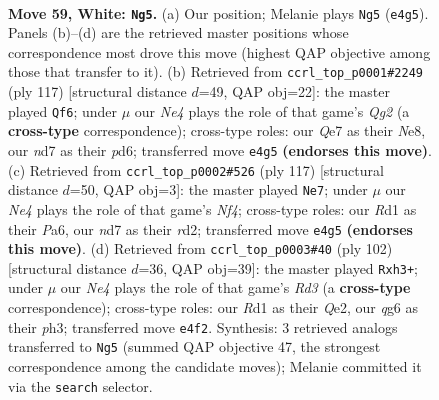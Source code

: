 \documentclass[11pt]{article}
\begin{document}
\clearpage

\begin{figure}[p]\centering
\begin{subfigure}{0.46\textwidth}\centering
\resizebox{\linewidth}{!}{%
\newchessgame
\chessboard[
  setfen={6rk/3nQ3/6q1/7p/p2pN3/P7/8/3R3K w - - 6 59},
  showmover=false,
  pgfstyle=straightmove, color=movearrow, markmove={e4-g5}
]}
\caption{}
\end{subfigure}\hfill
\begin{subfigure}{0.46\textwidth}\centering
\resizebox{\linewidth}{!}{%
\newchessgame
\chessboard[
  setfen={4n2k/6q1/p2Pp2p/8/b7/8/1P6/K5RQ b - - 7 59},
  showmover=false,
  pgfstyle=straightmove, color=movearrow, markmove={g7-f6}
]}
\caption{}
\end{subfigure}
\\[4pt]
\begin{subfigure}{0.46\textwidth}\centering
\resizebox{\linewidth}{!}{%
\newchessgame
\chessboard[
  setfen={3Q4/8/p4k2/5n2/5p1q/P7/1P1R4/5K2 b - - 4 59},
  showmover=false,
  pgfstyle=straightmove, color=movearrow, markmove={f5-e7}
]}
\caption{}
\end{subfigure}\hfill
\begin{subfigure}{0.46\textwidth}\centering
\resizebox{\linewidth}{!}{%
\newchessgame
\chessboard[
  setfen={2r4k/1p6/4q3/P2Np1b1/6P1/3R3p/4Q3/7K w - - 0 52},
  showmover=false,
  pgfstyle=straightmove, color=movearrow, markmove={d3-h3}
]}
\caption{}
\end{subfigure}
\caption{\textbf{Move 59, White: \texttt{Ng5}.} (a) Our position; Melanie plays \texttt{Ng5} (\texttt{e4g5}). Panels (b)--(d) are the retrieved master positions whose correspondence most drove this move (highest QAP objective among those that transfer to it). (b) Retrieved from \texttt{ccrl\_top\_p0001\#2249} (ply 117) [structural distance $d$=49, QAP obj=22]: the master played \texttt{Qf6}; under $\mu$ our \emph{Ne4} plays the role of that game's \emph{Qg2} (a \textbf{cross-type} correspondence); cross-type roles: our \emph{Q}e7 as their \emph{N}e8, our \emph{n}d7 as their \emph{p}d6; transferred move \texttt{e4g5} \textbf{(endorses this move)}. (c) Retrieved from \texttt{ccrl\_top\_p0002\#526} (ply 117) [structural distance $d$=50, QAP obj=3]: the master played \texttt{Ne7}; under $\mu$ our \emph{Ne4} plays the role of that game's \emph{Nf4}; cross-type roles: our \emph{R}d1 as their \emph{P}a6, our \emph{n}d7 as their \emph{r}d2; transferred move \texttt{e4g5} \textbf{(endorses this move)}. (d) Retrieved from \texttt{ccrl\_top\_p0003\#40} (ply 102) [structural distance $d$=36, QAP obj=39]: the master played \texttt{Rxh3+}; under $\mu$ our \emph{Ne4} plays the role of that game's \emph{Rd3} (a \textbf{cross-type} correspondence); cross-type roles: our \emph{R}d1 as their \emph{Q}e2, our \emph{q}g6 as their \emph{p}h3; transferred move \texttt{e4f2}. Synthesis: 3 retrieved analogs transferred to \texttt{Ng5} (summed QAP objective 47, the strongest correspondence among the candidate moves); Melanie committed it via the \texttt{search} selector.}
\label{fig:thought-m116}
\end{figure}
\end{document}
